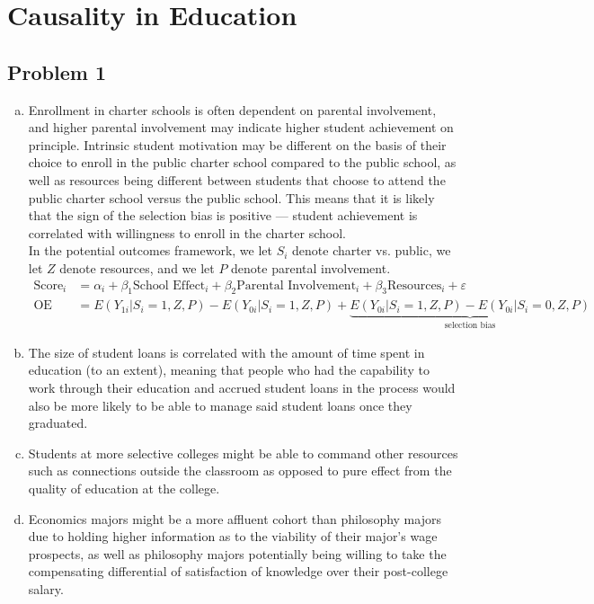 \documentclass[8pt]{extarticle}
\title{}
\author{}
\date{}
\begin{document}
\section{Causality in Education}%
\subsection{Problem 1}%
\begin{enumerate}[(a)]
  \item Enrollment in charter schools is often dependent on parental involvement, and higher parental involvement may indicate higher student achievement on principle. Intrinsic student motivation may be different on the basis of their choice to enroll in the public charter school compared to the public school, as well as resources being different between students that choose to attend the public charter school versus the public school. This means that it is likely that the sign of the selection bias is positive --- student achievement is correlated with willingness to enroll in the charter school.\\

    In the potential outcomes framework, we let $S_i$ denote charter vs. public, we let $Z$ denote resources, and we let $P$ denote parental involvement.
    \begin{align*}
      \text{Score}_i &= \alpha_i + \beta_1\text{School Effect}_i + \beta_2\text{Parental Involvement}_i + \beta_3\text{Resources}_i + \varepsilon\\
      \text{OE} &= E(Y_{1i}|S_i=1,Z,P) - E(Y_{0i}|S_i=1,Z,P) + \underbrace{E(Y_{0i}|S_i=1,Z,P)-E(Y_{0i}|S_i=0,Z,P)}_{\text{selection bias}}
    \end{align*}
  \item The size of student loans is correlated with the amount of time spent in education (to an extent), meaning that people who had the capability to work through their education and accrued student loans in the process would also be more likely to be able to manage said student loans once they graduated.
  \item Students at more selective colleges might be able to command other resources such as connections outside the classroom as opposed to pure effect from the quality of education at the college.
  \item Economics majors might be a more affluent cohort than philosophy majors due to holding higher information as to the viability of their major's wage prospects, as well as philosophy majors potentially being willing to take the compensating differential of satisfaction of knowledge over their post-college salary.
\end{enumerate}
\end{document}

